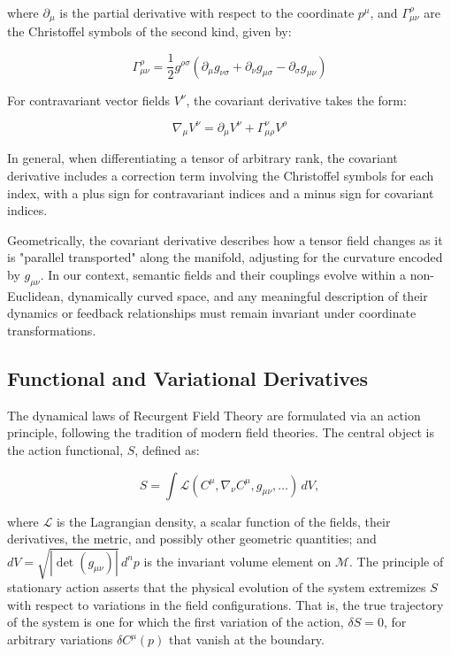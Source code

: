 where \(\partial_\mu\) is the partial derivative with respect to the coordinate \(p^\mu\), and \(\Gamma^\rho_{\mu\nu}\) are the Christoffel symbols \autocite{Christoffel1869} of the second kind, given by:

\begin{equation}
\Gamma^\rho_{\mu\nu} = \frac{1}{2} g^{\rho\sigma} \left( \partial_\mu g_{\nu\sigma} + \partial_\nu g_{\mu\sigma} - \partial_\sigma g_{\mu\nu} \right)
\end{equation}

For contravariant vector fields \(V^\nu\), the covariant derivative takes the form:

\begin{equation}
\nabla_\mu V^\nu = \partial_\mu V^\nu + \Gamma^\nu_{\mu\rho} V^\rho
\end{equation}

In general, when differentiating a tensor of arbitrary rank, the covariant derivative includes a correction term involving the Christoffel symbols for each index, with a plus sign for contravariant indices and a minus sign for covariant indices.

Geometrically, the covariant derivative describes how a tensor field changes as it is "parallel transported" along the manifold, adjusting for the curvature encoded by \(g_{\mu\nu}\). In our context, semantic fields and their couplings evolve within a non-Euclidean, dynamically curved space, and any meaningful description of their dynamics or feedback relationships must remain invariant under coordinate transformations.


\subsection{Functional and Variational Derivatives}
\label{2.4.4:functional_and_variational_derivatives}

The dynamical laws of Recurgent Field Theory are formulated via an action principle, following the tradition of modern field theories. The central object is the action functional, \(S\), defined as:

\begin{equation}
S = \int \mathcal{L}\left(C^\mu, \nabla_\nu C^\mu, g_{\mu\nu}, \ldots\right)\, dV,
\end{equation}

where \(\mathcal{L}\) is the Lagrangian density, a scalar function of the fields, their derivatives, the metric, and possibly other geometric quantities; and \(dV = \sqrt{|\det(g_{\mu\nu})|} \, d^n p\) is the invariant volume element on \(\mathcal{M}\). The principle of stationary action asserts that the physical evolution of the system extremizes \(S\) with respect to variations in the field configurations. That is, the true trajectory of the system is one for which the first variation of the action, \(\delta S = 0\), for arbitrary variations \(\delta C^\mu(p)\) that vanish at the boundary.

